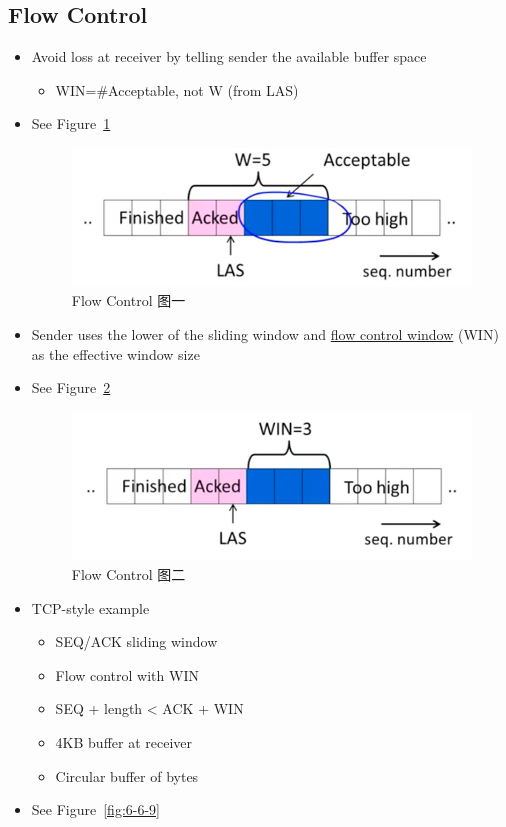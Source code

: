 \documentclass[12pt]{ctexart}   %
\begin{document}
	\subsection{Flow Control}
	\begin{itemize}
		\item Avoid loss at receiver by telling sender the available buffer space
		\begin{itemize}
			\item WIN=\#Acceptable, not W (from LAS)
		\end{itemize}
		\item See Figure~\ref{fig:6-6-7}
		  
		 \begin{figure}[h!] %
		\centering
		 \includegraphics[scale=0.7]{images/6-6-7}
		\caption{ Flow Control 图一  }
		 \label{fig:6-6-7}
		 \end{figure}
		 
		 \item Sender uses the lower of the sliding window and \underline{flow control window} (WIN) as the effective window size
		 \item See Figure~\ref{fig:6-6-8}
		  
		 \begin{figure}[h!] %
		\centering
		 \includegraphics[scale=0.7]{images/6-6-8}
		\caption{ Flow Control 图二  }
		 \label{fig:6-6-8}
		 \end{figure}
		 
		 \item TCP-style example
		 \begin{itemize}
		 	\item SEQ/ACK sliding window
		 	\item Flow control with WIN
		 	\item SEQ + length < ACK + WIN
		 	\item 4KB buffer at receiver
		 	\item Circular buffer of bytes
		 \end{itemize}
		  \item See Figure~\ref{fig:6-6-9}
		  

\end{itemize}
\end{document}

